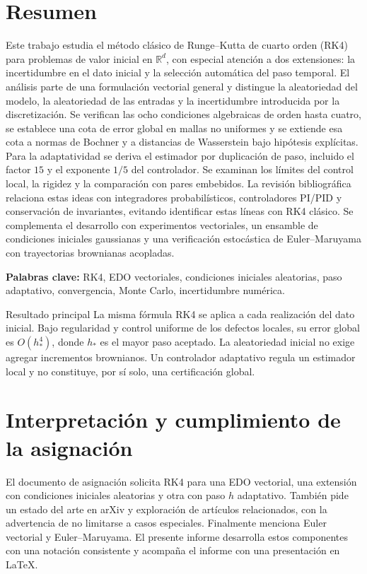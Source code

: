 \documentclass[11pt,a4paper]{article}
\theoremstyle{definition}\newtheorem{definition}[theorem]{Definición}
\theoremstyle{remark}\newtheorem{remark}[theorem]{Observación}
\newcommand{\R}{\mathbb R}\newcommand{\E}{\mathbb E}
\begin{document}
\section*{Resumen}
Este trabajo estudia el método clásico de Runge--Kutta de cuarto orden (RK4)
para problemas de valor inicial en $\R^d$, con especial atención a dos
extensiones: la incertidumbre en el dato inicial y la selección automática del
paso temporal. El análisis parte de una formulación vectorial general y
distingue la aleatoriedad del modelo, la aleatoriedad de las entradas y la
incertidumbre introducida por la discretización. Se verifican las ocho
condiciones algebraicas de orden hasta cuatro, se establece una cota de error
global en mallas no uniformes y se extiende esa cota a normas de Bochner y a
distancias de Wasserstein bajo hipótesis explícitas. Para la adaptatividad se
deriva el estimador por duplicación de paso, incluido el factor $15$ y el
exponente $1/5$ del controlador. Se examinan los límites del control local, la
rigidez y la comparación con pares embebidos. La revisión bibliográfica
relaciona estas ideas con integradores probabilísticos, controladores PI/PID
y conservación de invariantes, evitando identificar estas líneas con RK4
clásico. Se complementa el desarrollo con experimentos vectoriales, un
ensamble de condiciones iniciales gaussianas y una verificación estocástica
de Euler--Maruyama con trayectorias brownianas acopladas.

\textbf{Palabras clave:} RK4, EDO vectoriales, condiciones iniciales aleatorias,
paso adaptativo, convergencia, Monte Carlo, incertidumbre numérica.

\begin{keybox}{Resultado principal}
La misma fórmula RK4 se aplica a cada realización del dato inicial. Bajo
regularidad y control uniforme de los defectos locales, su error global es
$O(h_*^4)$, donde $h_*$ es el mayor paso aceptado. La aleatoriedad inicial
no exige agregar incrementos brownianos. Un controlador adaptativo regula
un estimador local y no constituye, por sí solo, una certificación global.
\end{keybox}
\clearpage
\setcounter{tocdepth}{1}
\tableofcontents
\clearpage
\section{Interpretación y cumplimiento de la asignación}
El documento de asignación solicita RK4 para una EDO vectorial, una extensión
con condiciones iniciales aleatorias y otra con paso $h$ adaptativo. También
pide un estado del arte en arXiv y exploración de artículos relacionados,
con la advertencia de no limitarse a casos especiales. Finalmente menciona
Euler vectorial y Euler--Maruyama. El presente informe desarrolla estos
componentes con una notación consistente y acompaña el informe con una
presentación en LaTeX.
\end{document}
